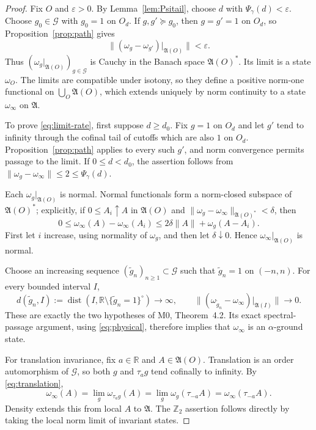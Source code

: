 \documentclass[11pt,a4paper]{article}
\theoremstyle{remark}
\newcommand{\R}{\mathbb R}
\newcommand{\A}{\mathfrak A}
\newcommand{\G}{\mathcal G}
\DeclareMathOperator{\dist}{dist}
\begin{document}
\begin{proof}
Fix $O$ and $\varepsilon>0$.  By Lemma~\ref{lem:Psitail}, choose $d$ with
$\Psi_\gamma(d)<\varepsilon$.  Choose $g_0\in\G$ with $g_0=1$ on $O_d$.  If
$g,g'\succcurlyeq g_0$, then $g=g'=1$ on $O_d$, so Proposition~\ref{prop:path} gives
\[
 \| (\omega_g-\omega_{g'})|_{\A(O)}\|<\varepsilon.
\]
Thus $(\omega_g|_{\A(O)})_{g\in\G}$ is Cauchy in the Banach space $\A(O)^*$.
Its limit is a state $\omega_O$.  The limits are compatible under isotony, so they define a
positive norm-one functional on $\bigcup_O\A(O)$, which extends uniquely by norm continuity to a
state $\omega_\infty$ on $\A$.

To prove \eqref{eq:limit-rate}, first suppose $d\ge d_0$.  Fix $g=1$ on $O_d$ and let $g'$ tend to
infinity through the cofinal tail of cutoffs which are also $1$ on $O_d$.
Proposition~\ref{prop:path} applies to every such $g'$, and norm convergence permits passage to the
limit.  If $0\le d<d_0$, the assertion follows from
$\|\omega_g-\omega_\infty\|\le2\le\Psi_\gamma(d)$.

Each $\omega_g|_{\A(O)}$ is normal.  Normal functionals form a norm-closed subspace of
$\A(O)^*$; explicitly, if $0\le A_i\uparrow A$ in $\A(O)$ and
$\|\omega_g-\omega_\infty\|_{\A(O)^*}<\delta$, then
\[
 0\le\omega_\infty(A)-\omega_\infty(A_i)
 \le2\delta\|A\|+\omega_g(A-A_i).
\]
First let $i$ increase, using normality of $\omega_g$, and then let $\delta\downarrow0$.
Hence $\omega_\infty|_{\A(O)}$ is normal.

Choose an increasing sequence $(\widetilde g_n)_{n\ge1}\subset\G$ such that
$\widetilde g_n=1$ on $(-n,n)$.  For every bounded interval $I$,
\[
 d(\widetilde g_n,I):=
 \dist\!\left(I,\R\setminus\{\widetilde g_n=1\}^{\circ}\right)\longrightarrow\infty,
 \qquad
 \| (\omega_{\widetilde g_n}-\omega_\infty)|_{\A(I)}\|\longrightarrow0.
\]
These are exactly the two hypotheses of M0, Theorem~4.2.  Its exact spectral-passage argument,
using \eqref{eq:physical}, therefore implies that $\omega_\infty$ is an $\alpha$-ground state.

For translation invariance, fix $a\in\R$ and $A\in\A(O)$.  Translation is an order automorphism
of $\G$, so both $g$ and $\tau_ag$ tend cofinally to infinity.  By \eqref{eq:translation},
\[
 \omega_\infty(A)
 =\lim_g\omega_{\tau_ag}(A)
 =\lim_g\omega_g(\tau_{-a}A)
 =\omega_\infty(\tau_{-a}A).
\]
Density extends this from local $A$ to $\A$.  The $\mathbb Z_2$ assertion follows directly by
taking the local norm limit of invariant states.
\end{proof}
\end{document}
